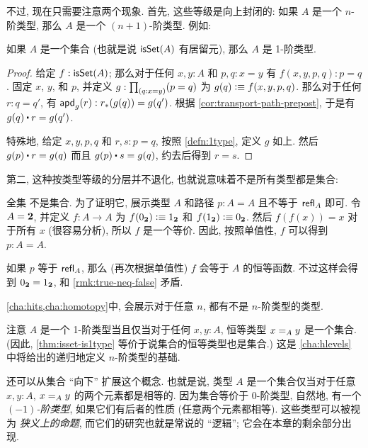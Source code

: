 不过, 现在只需要注意两个现象.
首先, 这些等级是向上封闭的: 如果 $A$ 是一个 $n$-阶类型, 那么 $A$ 是一个 $(n+1)$-阶类型.
例如:

\begin{lem}
    \label{thm:isset-is1type}
    如果 $A$ 是一个集合 (也就是说 $\isset(A)$ 有居留元), 那么 $A$ 是 1-阶类型.
\end{lem}
\begin{proof}
    给定 $f:\isset(A)$; 那么对于任何 $x,y:A$ 和 $p,q:x=y$ 有 $f(x,y,p,q):p=q$.
    固定 $x$, $y$, 和 $p$, 并定义 $g: \prd{q:x=y} (p=q)$ 为 $g(q) \defeq f (x,y,p,q)$.
    那么对于任何 $r:q=q'$, 有 $\apdfunc{g}(r) : \trans{r}{g(q)} = g(q')$.
    根据 \cref{cor:transport-path-prepost}, 于是有 $g(q) \ct r = g(q')$.

    特殊地, 给定 $x,y,p,q$ 和 $r,s:p=q$, 按照 \cref{defn:1type}, 定义 $g$ 如上.
    然后 $g(p) \ct r = g(q)$ 而且 $g(p) \ct s = g(q)$, 约去后得到 $r=s$.
\end{proof}

第二, 这种按类型等级的分层并不退化, 也就说意味着不是所有类型都是集合:

\begin{eg}
    \label{thm:type-is-not-a-set}
    全集 \type 不是集合.
    为了证明它, 展示类型 $A$ 和路径 $p:A=A$ 且不等于 $\refl A$ 即可.
    令 $A=\bool$, 并定义 $f:A\to A$ 为 $f(\bfalse)\defeq \btrue$ 和 $f(\btrue)\defeq \bfalse$.
    然后 $f(f(x))=x$ 对于所有 $x$ (很容易分析), 所以 $f$ 是一个等价.
    因此, 按照单值性, $f$ 可以得到 $p:A=A$.

    如果 $p$ 等于 $\refl A$, 那么 (再次根据单值性) $f$ 会等于 $A$ 的恒等函数.
    不过这样会得到 $\bfalse=\btrue$, 和 \cref{rmk:true-neq-false} 矛盾.
\end{eg}

\cref{cha:hits,cha:homotopy}中, 会展示对于任意 $n$, 都有不是 $n$-阶类型的类型.

注意 $A$ 是一个 1-阶类型当且仅当对于任何 $x,y:A$, 恒等类型 $\id[A]xy$ 是一个集合.
(因此, \cref{thm:isset-is1type} 等价于说集合的恒等类型也是集合.)
这是 \cref{cha:hlevels} 中将给出的递归地定义 $n$-阶类型的基础.

还可以从集合 ``向下'' 扩展这个概念.
也就是说, 类型 $A$ 是一个集合仅当对于任意 $x,y:A$, $\id[A]xy$ 的两个元素都是相等的.
因为集合等价于 0-阶类型, 自然地, 有一个 \emph{$(-1)$-阶类型}, 如果它们有后者的性质 (任意两个元素都相等).
这些类型可以被视为 \emph{狭义上的命题}, 而它们的研究也就是常说的 ``逻辑'';
它会在本章的剩余部分出现.

%
%
